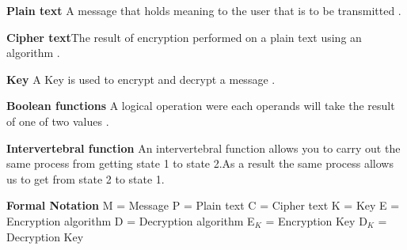 \documentclass[11pt,a4paper]{report}
\begin{document}
\textbf{Plain text}\newline
A message that holds meaning to the user that is to be transmitted \cite{DBLP:books/sp/Buchmann02}. \newline

\textbf{Cipher text}\newline The result of encryption performed on a plain text using an algorithm \cite{Berti2003CISSP}.\newline

\textbf{Key}\newline
A Key is used to encrypt and decrypt a message \cite{Berti2003CISSP}. \newline

\textbf{Boolean functions}\newline
A logical operation were each operands will take the result of one of two values \cite{Gregory2013Cryptanalysis}. \newline

\textbf{Intervertebral function}\newline
An intervertebral function allows you to carry out the
same process from getting state 1 to state 2.As a result the same process
allows us to get from state 2 to state 1. \newline

\textbf{Formal Notation}\newline
M = Message \newline
P = Plain text \newline
C = Cipher text \newline
K = Key \newline
E = Encryption algorithm \newline
D = Decryption algorithm \newline
E$_{K}$ = Encryption Key \newline
D$_{K}$ = Decryption Key \newline
\end{document}
